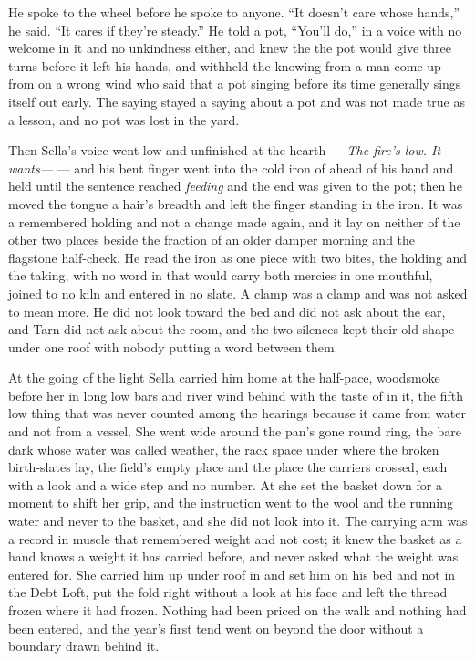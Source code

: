 He spoke to the wheel before he spoke to anyone. “It doesn't care whose hands,” he said. “It cares if they're steady.” He told a pot, “You'll do,” in a voice with no welcome in it and no unkindness either, and knew the  the pot would give three turns before it left his hands, and withheld the knowing from a man come up from  on a wrong wind who said that a pot singing before its time generally sings itself out early. The saying stayed a saying about a pot and was not made true as a lesson, and no pot was lost in the yard.

Then Sella's voice went low and unfinished at the hearth --- \emph{The fire's low. It wants---} --- and his bent finger went into the cold iron of  ahead of his hand and held until the sentence reached \emph{feeding} and the end was given to the pot; then he moved the tongue a hair's breadth and left the finger standing in the iron. It was a remembered holding and not a change made again, and it lay on neither of the other two places beside the fraction of an older damper morning and the flagstone half-check. He read the iron as one piece with two bites, the holding and the taking, with no word in  that would carry both mercies in one mouthful, joined to no kiln and entered in no slate. A clamp was a clamp and was not asked to mean more. He did not look toward the bed and did not ask about the ear, and Tarn did not ask about the room, and the two silences kept their old shape under one roof with nobody putting a word between them.

\scenebreak

At the going of the light Sella carried him home at the half-pace, woodsmoke before her in long low bars and river wind behind with the taste of  in it, the fifth low thing that was never counted among the hearings because it came from water and not from a vessel. She went wide around the pan's gone round ring, the bare dark  whose water was called weather, the rack space under  where the broken birth-slates lay, the field's empty place and the place the carriers crossed, each with a look and a wide step and no number. At  she set the basket down for a moment to shift her grip, and the instruction went to the wool and the running water and never to the basket, and she did not look into it. The carrying arm was a record in muscle that remembered weight and not cost; it knew the basket as a hand knows a weight it has carried before, and never asked what the weight was entered for. She carried him up under  roof in  and set him on his bed and not in the Debt Loft, put the fold right without a look at his face and left the thread frozen where it had frozen. Nothing had been priced on the walk and nothing had been entered, and the year's first tend went on beyond the door without a boundary drawn behind it.

